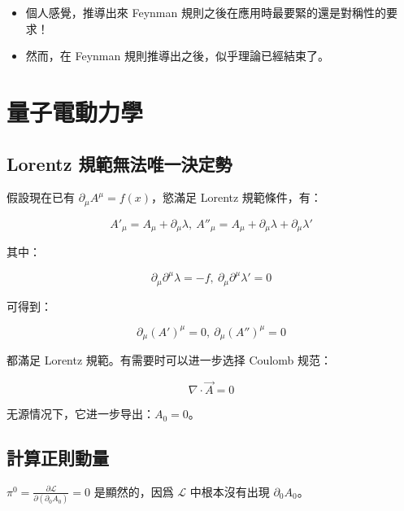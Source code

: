 \documentclass{article}
\begin{document}
\begin{itemize}
\item 個人感覺，推導出來 Feynman 規則之後在應用時最要緊的還是對稱性的要求！
\item 然而，在 Feynman 規則推導出之後，似乎理論已經結束了。
\end{itemize}

\section{量子電動力學}

\subsection{Lorentz 規範無法唯一決定勢}

假設現在已有 $\partial_{\mu}A^{\mu}=f(x)$，慾滿足 Lorentz 規範條件，有：

$$
A'_{\mu}=A_{\mu}+\partial_{\mu}\lambda,\ A''_{\mu}=A_{\mu}+\partial_{\mu}\lambda+\partial_{\mu}\lambda'
$$

其中：

$$
\partial_{\mu}\partial^{\mu}\lambda=-f,\ \partial_{\mu}\partial^{\mu}\lambda'=0
$$

可得到：

$$
\partial_{\mu}(A')^{\mu}=0,\ \partial_{\mu}(A'')^{\mu}=0
$$

都滿足 Lorentz 規範。有需要时可以进一步选择 Coulomb 规范：

$$
\nabla\cdot\vec{A}=0
$$

无源情况下，它进一步导出：$A_0=0$。

\subsection{計算正則動量}

$\pi^0=\frac{\partial\mathcal{L}}{\partial(\partial_0A_0)}=0$ 是顯然的，因爲 $\mathcal{L}$ 中根本沒有出現 $\partial_0A_0$。
\end{document}
